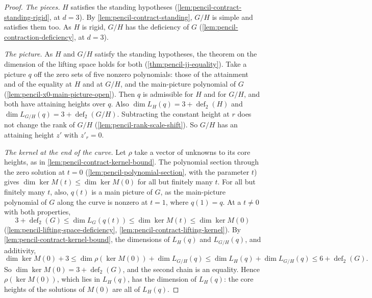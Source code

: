 \begin{proof}
  \leanok
  \emph{The pieces.} $H$ satisfies the standing hypotheses
  (\cref{lem:pencil-contract-standing-rigid}, at $d = 3$). By
  \cref{lem:pencil-contract-standing}, $G/H$ is simple and satisfies them
  too. As $H$ is rigid, $G/H$ has the deficiency of $G$
  (\cref{lem:pencil-contraction-deficiency}, at $d = 3$).

  \emph{The picture.} As $H$ and $G/H$ satisfy the standing hypotheses,
  the theorem on the dimension of the lifting space holds for both
  (\cref{thm:pencil-jj-equality}). Take a picture $q$ off
  the zero sets of five nonzero polynomials: those of the attainment and
  of the equality at $H$ and at $G/H$, and the main-picture polynomial of
  $G$ (\cref{lem:pencil-x0-main-picture-open}). Then $q$ is admissible for
  $H$ and for $G/H$, and both have attaining heights over $q$. Also
  $\dim L_H(q) = 3 + \operatorname{def}_2(H)$ and
  $\dim L_{G/H}(q) = 3 + \operatorname{def}_2(G/H)$. Subtracting the
  constant height at $r$ does not change the rank of $G/H$
  (\cref{lem:pencil-rank-scale-shift}). So $G/H$ has an attaining height
  $z'$ with $z'_r = 0$.

  \emph{The kernel at the end of the curve.} Let $\rho$ take a vector of
  unknowns to its core heights, as in
  \cref{lem:pencil-contract-kernel-bound}. The polynomial section through
  the zero solution at $t = 0$ (\cref{lem:pencil-polynomial-section},
  with the parameter $t$) gives
  $\dim \ker M(t) \le \dim \ker M(0)$ for all but finitely many $t$. For
  all but finitely many $t$, also, $q(t)$ is a main picture of $G$, as
  the main-picture polynomial of $G$ along the curve is nonzero at
  $t = 1$, where $q(1) = q$. At a $t \neq 0$ with both properties,
  \[
    3 + \operatorname{def}_2(G) \le \dim L_G(q(t)) \le \dim \ker M(t)
    \le \dim \ker M(0)
  \]
  (\cref{lem:pencil-lifting-space-deficiency},
  \cref{lem:pencil-contract-lifting-kernel}). By
  \cref{lem:pencil-contract-kernel-bound}, the dimensions of $L_H(q)$ and
  $L_{G/H}(q)$, and additivity,
  \[
    \dim \ker M(0) + 3 \le \dim \rho(\ker M(0)) + \dim L_{G/H}(q)
    \le \dim L_H(q) + \dim L_{G/H}(q) \le 6 + \operatorname{def}_2(G).
  \]
  So $\dim \ker M(0) = 3 + \operatorname{def}_2(G)$, and the second chain
  is an equality. Hence $\rho(\ker M(0))$, which lies in $L_H(q)$, has the
  dimension of $L_H(q)$: the core heights of the solutions of $M(0)$ are
  all of $L_H(q)$.


\end{proof}
